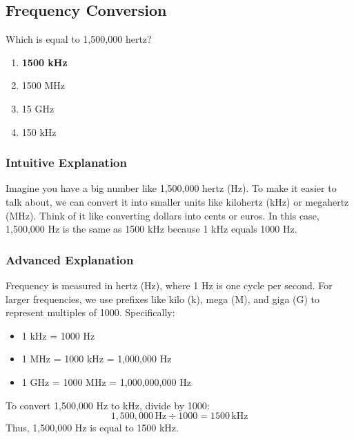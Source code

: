 \subsection{Frequency Conversion}\label{T5B02}

\begin{tcolorbox}[colback=gray!10!white,colframe=black!75!black,title=T5B02]
Which is equal to 1,500,000 hertz?
\begin{enumerate}[noitemsep]
    \item \textbf{1500 kHz}
    \item 1500 MHz
    \item 15 GHz
    \item 150 kHz
\end{enumerate}
\end{tcolorbox}

\subsubsection*{Intuitive Explanation}
Imagine you have a big number like 1,500,000 hertz (Hz). To make it easier to talk about, we can convert it into smaller units like kilohertz (kHz) or megahertz (MHz). Think of it like converting dollars into cents or euros. In this case, 1,500,000 Hz is the same as 1500 kHz because 1 kHz equals 1000 Hz.

\subsubsection*{Advanced Explanation}
Frequency is measured in hertz (Hz), where 1 Hz is one cycle per second. For larger frequencies, we use prefixes like kilo (k), mega (M), and giga (G) to represent multiples of 1000. Specifically:
\begin{itemize}
    \item 1 kHz = 1000 Hz
    \item 1 MHz = 1000 kHz = 1,000,000 Hz
    \item 1 GHz = 1000 MHz = 1,000,000,000 Hz
\end{itemize}
To convert 1,500,000 Hz to kHz, divide by 1000:
\[
1,500,000 \, \text{Hz} \div 1000 = 1500 \, \text{kHz}
\]
Thus, 1,500,000 Hz is equal to 1500 kHz.